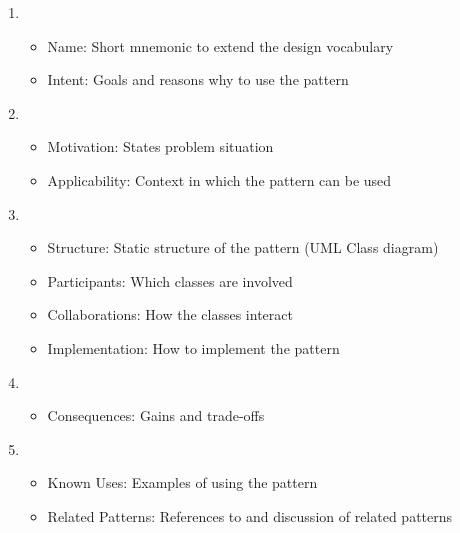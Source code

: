 \documentclass[
../../Software_Engineering_Summary.tex,
]
{subfiles}
\begin{document}
\begin{defbox}
    \begin{enumerate}
        \item 
        \begin{itemize}
            \item Name: Short mnemonic to extend the design vocabulary
            \item Intent: Goals and reasons why to use the pattern
        \end{itemize}
        \hrulefill
        \item 
        \begin{itemize}
            \item Motivation: States problem situation
            \item Applicability: Context in which the pattern can be used
        \end{itemize}
        \hrulefill
        \item 
        \begin{itemize}
            \item Structure: Static structure of the pattern (UML Class diagram)
            \item Participants: Which classes are involved 
            \item Collaborations: How the classes interact
            \item Implementation: How to implement the pattern
        \end{itemize}
        \hrulefill
        \item 
        \begin{itemize}
            \item Consequences: Gains and trade-offs
        \end{itemize}
        \hrulefill
        \item 
        \begin{itemize}
            \item Known Uses: Examples of using the pattern
            \item Related Patterns: References to and discussion of related patterns
        \end{itemize}
    \end{enumerate}
\end{defbox}
\end{document}
